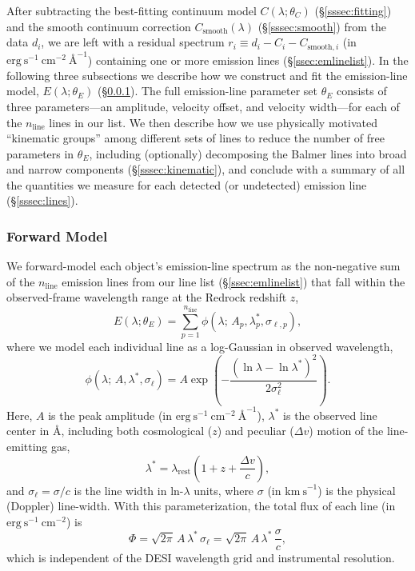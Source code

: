 \documentclass[modern,linenumbers]{aastex701}
\newcommand{\kms}{\ensuremath{\mathrm{km~s}^{-1}}}
\newcommand{\flux}{\ensuremath{\mathrm{erg~s}^{-1}~\mathrm{cm}^{-2}}}
\newcommand{\fluxdensity}{\ensuremath{\mathrm{erg~s}^{-1}~\mathrm{cm}^{-2}~\text{\AA}^{-1}}}
\begin{document}
After subtracting the best-fitting continuum model
$C(\lambda;\theta_C)$ (\S\ref{sssec:fitting}) and the smooth continuum
correction $C_\mathrm{smooth}(\lambda)$ (\S\ref{sssec:smooth}) from
the data $d_i$, we are left with a residual spectrum $r_i \equiv d_i -
C_i - C_{\mathrm{smooth},i}$ (in \fluxdensity) containing one or more
emission lines (\S\ref{ssec:emlinelist}). In the following three
subsections we describe how we construct and fit the emission-line
model, $E(\lambda;\theta_E)$ (\S\ref{sssec:emline_model}). The full
emission-line parameter set $\theta_E$ consists of three
parameters---an amplitude, velocity offset, and velocity width---for
each of the $n_\mathrm{line}$ lines in our list. We then describe how
we use physically motivated ``kinematic groups'' among different sets
of lines to reduce the number of free parameters in $\theta_E$,
including (optionally) decomposing the Balmer lines into broad and
narrow components (\S\ref{sssec:kinematic}), and conclude with a
summary of all the quantities we measure for each detected (or
undetected) emission line (\S\ref{sssec:lines}).

\subsubsection{Forward Model}
\label{sssec:emline_model}

We forward-model each object's emission-line spectrum as the
non-negative sum of the $n_\mathrm{line}$ emission lines from our line
list (\S\ref{ssec:emlinelist}) that fall within the observed-frame
wavelength range at the Redrock redshift $z$,
\begin{equation}
  E(\lambda;\theta_E) = \sum_{p=1}^{n_\mathrm{line}}
    \phi(\lambda;\,A_p,\lambda_p^*,\sigma_{\ell,p}),
  \label{eq:emline_sum}
\end{equation}
where we model each individual line as a log-Gaussian in observed
wavelength,
\begin{equation}
  \phi(\lambda;\,A,\lambda^*,\sigma_\ell)
  =
  A\exp\!\left(-\frac{(\ln\lambda - \ln\lambda^*)^{2}}{2\sigma_\ell^{2}}\right).
  \label{eq:intrinsic}
\end{equation}
Here, $A$ is the peak amplitude (in \fluxdensity), $\lambda^*$ is the
observed line center in \AA, including both cosmological ($z$) and
peculiar ($\Delta v$) motion of the line-emitting gas,
\begin{equation}
  \lambda^* = \lambda_\mathrm{rest}
    \left(1 + z + \frac{\Delta v}{c}\right),
  \label{eq:lstar}
\end{equation}
and $\sigma_\ell = \sigma/c$ is the line width in ln-$\lambda$ units,
where $\sigma$ (in \kms) is the physical (Doppler) line-width. With
this parameterization, the total flux of each line (in \flux) is
\begin{equation}
  \Phi = \sqrt{2\pi}\,A\,\lambda^*\,\sigma_\ell
       = \sqrt{2\pi}\,A\,\lambda^*\,\frac{\sigma}{c},
  \label{eq:flux_phys}
\end{equation}
which is independent of the DESI wavelength grid and instrumental
resolution.
\end{document}
